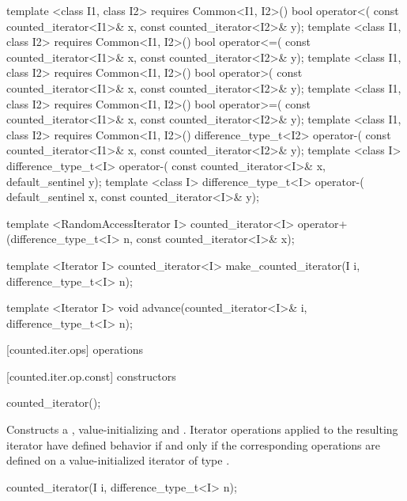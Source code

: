 \begin{codeblock}
{{{{  template <class I1, class I2>
      requires Common<I1, I2>()
    bool operator<(
      const counted_iterator<I1>& x, const counted_iterator<I2>& y);
  template <class I1, class I2>
      requires Common<I1, I2>()
    bool operator<=(
      const counted_iterator<I1>& x, const counted_iterator<I2>& y);
  template <class I1, class I2>
      requires Common<I1, I2>()
    bool operator>(
      const counted_iterator<I1>& x, const counted_iterator<I2>& y);
  template <class I1, class I2>
      requires Common<I1, I2>()
    bool operator>=(
      const counted_iterator<I1>& x, const counted_iterator<I2>& y);
  template <class I1, class I2>
      requires Common<I1, I2>()
    difference_type_t<I2> operator-(
      const counted_iterator<I1>& x, const counted_iterator<I2>& y);
  template <class I>
    difference_type_t<I> operator-(
      const counted_iterator<I>& x, default_sentinel y);
  template <class I>
    difference_type_t<I> operator-(
      default_sentinel x, const counted_iterator<I>& y);

  template <RandomAccessIterator I>
    counted_iterator<I>
      operator+(difference_type_t<I> n, const counted_iterator<I>& x);

  template <Iterator I>
    counted_iterator<I> make_counted_iterator(I i, difference_type_t<I> n);

  template <Iterator I>
    void advance(counted_iterator<I>& i, difference_type_t<I> n);
}}}}
\end{codeblock}

[counted.iter.ops]{ operations}

[counted.iter.op.const]{ constructors}

%
\begin{itemdecl}
counted_iterator();
\end{itemdecl}

\begin{itemdescr}
\pnum
\effects Constructs a , value-initializing
 and . Iterator operations applied to the
resulting iterator have defined behavior if and only if the corresponding operations
are defined on a value-initialized iterator of type .
\end{itemdescr}

%
\begin{itemdecl}
counted_iterator(I i, difference_type_t<I> n);
\end{itemdecl}

